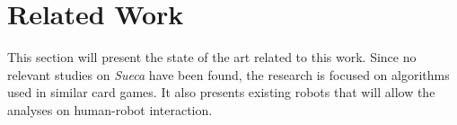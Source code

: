 \section{Related Work} \label{sec:related-work}

This section will present the state of the art related to this work.
Since no relevant studies on \emph{Sueca} have been found, the research is focused on algorithms used in similar card games.
It also presents existing robots that will allow the analyses on human-robot interaction.



